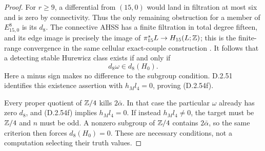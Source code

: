 \begin{proof}
For $r\ge9$, a differential from $(15,0)$ would land
in filtration at most six and is zero by connectivity.
Thus the only remaining obstruction for a member of
$E^8_{15,0}$ is its $d_8$.  The connective AHSS has a
finite filtration in total degree fifteen, and its
edge image is precisely the image of
$\pi_{15}^sL\to H_{15}(L;\mathbb Z)$; this is the finite-range
convergence in the same cellular exact-couple construction
\cite[Part III, Section 7]{EH5Adams1974AHSS}.
It follows that a detecting stable Hurewicz class exists
if and only if
\[
                      d_8\omega\in d_8(H_0).
                      \tag{D.2.54n}
\]
Here a minus sign makes no difference to the subgroup
condition.  D.2.51 identifies this existence assertion
with $h_Ml_4=0$, proving \textup{(D.2.54f)}.

Every proper quotient of $\mathbb Z/4$ kills $2\bar\alpha$.
In that case the particular $\omega$ already has zero
$d_8$, and \textup{(D.2.54f)} implies $h_Ml_4=0$.
If instead $h_Ml_4\ne0$, the target must be $\mathbb Z/4$
and $n$ must be odd.  A nonzero subgroup of $\mathbb Z/4$
contains $2\bar\alpha$, so the same criterion then
forces $d_8(H_0)=0$.  These are necessary conditions,
not a computation selecting their truth values.
\end{proof}

